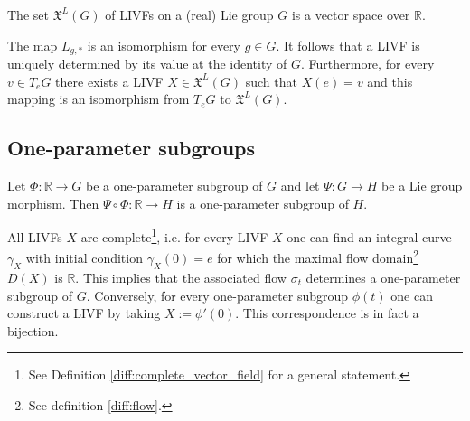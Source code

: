     \begin{property}
        The set $\mathfrak{X}^L(G)$ of LIVFs on a (real) Lie group $G$ is a vector space over $\mathbb{R}$.
    \end{property}
    \begin{property}\label{lie:livf_prop}
        The map $L_{g,\ast}$ is an isomorphism for every $g\in G$. It follows that a LIVF is uniquely determined by its value at the identity of $G$. Furthermore, for every $v\in T_eG$ there exists a LIVF $X\in\mathfrak{X}^L(G)$ such that $X(e)=v$ and this mapping is an isomorphism from $T_eG$ to $\mathfrak{X}^L(G)$.
    \end{property}

\subsection{One-parameter subgroups}

    \begin{property}\label{lie:OPS_composition}
        Let $\Phi:\mathbb{R}\rightarrow G$ be a one-parameter subgroup of $G$ and let $\Psi:G\rightarrow H$ be a Lie group morphism. Then $\Psi\circ\Phi:\mathbb{R}\rightarrow H$ is a one-parameter subgroup of $H$.
    \end{property}

    \begin{property}\label{lie:livf_subgroup}
        All LIVFs $X$ are complete\footnote{See Definition \ref{diff:complete_vector_field} for a general statement.}, i.e. for every LIVF $X$ one can find an integral curve $\gamma_X$ with initial condition $\gamma_X(0) = e$ for which the maximal flow domain\footnote{See definition \ref{diff:flow}.} $D(X)$ is $\mathbb{R}$. This implies that the associated flow $\sigma_t$ determines a one-parameter subgroup of $G$. Conversely, for every one-parameter subgroup $\phi(t)$ one can construct a LIVF by taking $X := \phi'(0)$. This correspondence is in fact a bijection.
    \end{property}

